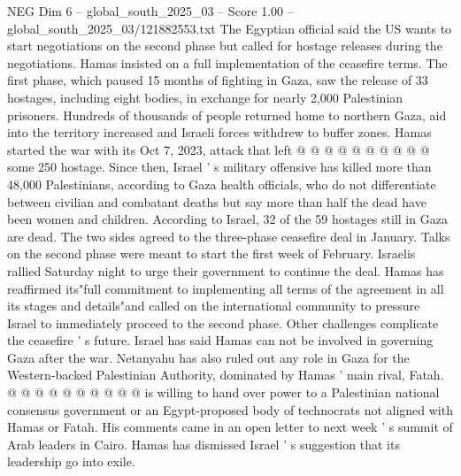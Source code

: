 \begin{textsample}{NEG Dim 6 – global\_south\_2025\_03 – Score 1.00 – global\_south\_2025\_03/121882553.txt}
The Egyptian official said the US wants to start negotiations on the second phase but called for hostage releases during the negotiations.
Hamas insisted on a full implementation of the ceasefire terms.
The first phase, which paused 15 months of fighting in Gaza, saw the release of 33 hostages, including eight bodies, in exchange for nearly 2,000 Palestinian prisoners.
Hundreds of thousands of people returned home to northern Gaza, aid into the territory increased and Israeli forces withdrew to buffer zones.
Hamas started the war with its Oct 7, 2023, attack that left @ @ @ @ @ @ @ @ @ @ some 250 hostage.
Since then, Israel ' s military offensive has killed more than 48,000 Palestinians, according to Gaza health officials, who do not differentiate between civilian and combatant deaths but say more than half the dead have been women and children.
According to Israel, 32 of the 59 hostages still in Gaza are dead.
The two sides agreed to the three-phase ceasefire deal in January.
Talks on the second phase were meant to start the first week of February.
Israelis rallied Saturday night to urge their government to continue the deal.
Hamas has reaffirmed its"full commitment to implementing all terms of the agreement in all its stages and details"and called on the international community to pressure Israel to immediately proceed to the second phase.
Other challenges complicate the ceasefire ' s future.
Israel has said Hamas can not be involved in governing Gaza after the war.
Netanyahu has also ruled out any role in Gaza for the Western-backed Palestinian Authority, dominated by Hamas ' main rival, Fatah. @ @ @ @ @ @ @ @ @ @ is willing to hand over power to a Palestinian national consensus government or an Egypt-proposed body of technocrats not aligned with Hamas or Fatah.
His comments came in an open letter to next week ' s summit of Arab leaders in Cairo.
Hamas has dismissed Israel ' s suggestion that its leadership go into exile.

\end{textsample}
